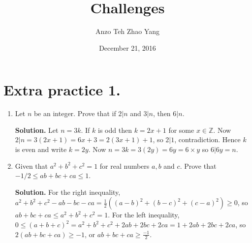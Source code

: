 \documentclass[11pt]{article}
\title{Challenges}
\author{ Anzo Teh Zhao Yang}
\date{December 21, 2016}
\begin{document}
\maketitle

\section {Extra practice 1.}
\begin{enumerate}
\item Let $n$ be an integer. Prove that if $2|n$ and $3|n$, then $6|n$.

\textbf {Solution.} Let $n=3k$. If $k$ is odd then $k=2x+1$ for some $x\in\mathbb{Z}$. Now $2|n=3(2x+1)=6x+3=2(3x+1)+1$, so $2|1$, contradiction. Hence $k$ is even and write $k=2y$. Now $n=3k=3(2y)=6y=6\times y$ so $6|6y=n$.

\item Given that $a^2+b^2+c^2=1$ for real numbers $a,b$ and $c$. Prove that $-1/2\le ab+bc+ca\le 1$.

\textbf {Solution.} For the right inequality, $a^2+b^2+c^2-ab-bc-ca=\frac12((a-b)^2+(b-c)^2+(c-a)^2)\ge 0$, so $ab+bc+ca\le a^2+b^2+c^2=1$. For the left inequality, $0\le (a+b+c)^2=a^2+b^2+c^2+2ab+2bc+2ca=1+2ab+2bc+2ca$, so $2(ab+bc+ca)\ge -1$, or $ab+bc+ca\ge\frac{-1}{2}$.
\end{enumerate}
\end{document}
